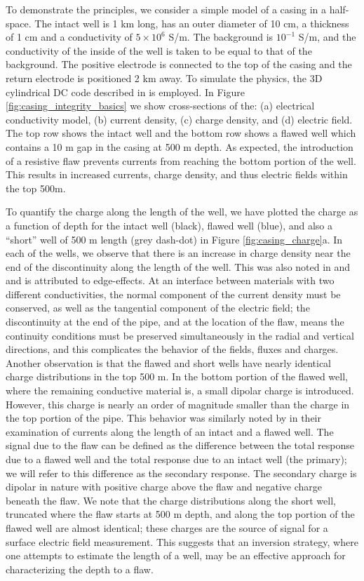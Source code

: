 \documentclass[extra,mreferee]{gji}
\begin{document}
To demonstrate the principles, we consider a simple model of a casing in a half-space. The intact well is 1 km long, has an outer diameter of 10 cm, a thickness of 1 cm and a conductivity of $5\times10^6$ S/m. The background is $10^{-1}$ S/m, and the conductivity of the inside of the well is taken to be equal to that of the background. The positive electrode is connected to the top of the casing and the return electrode is positioned 2 km away. To simulate the physics, the 3D cylindrical DC code described in \cite{Heagy2018a} is employed. In Figure \ref{fig:casing_integrity_basics} we show cross-sections of the: (a) electrical conductivity model, (b) current density, (c) charge density, and (d) electric field. The top row shows the intact well and the bottom row shows a flawed well which contains a 10 m gap in the casing at 500 m depth. As expected, the introduction of a resistive flaw prevents currents from reaching the bottom portion of the well. This results in increased currents, charge density, and thus electric fields within the top 500m.


To quantify the charge along the length of the well, we have plotted the charge as a function of depth for the intact well (black), flawed well (blue), and also a ``short'' well of 500 m length (grey dash-dot) in Figure \ref{fig:casing_charge}a. In each of the wells, we observe that there is an increase in charge density near the end of the discontinuity along the length of the well. This was also noted  in \cite{Griffiths1997} and \cite{Heagy2018a} and is attributed to edge-effects. At an interface between materials with two different conductivities, the normal component of the current density must be conserved, as well as the tangential component of the electric field; the discontinuity at the end of the pipe, and at the location of the flaw, means the continuity conditions must be preserved simultaneously in the radial and vertical directions, and this complicates the behavior of the fields, fluxes and charges. Another observation is that the flawed and short wells have nearly identical charge distributions in the top 500 m. In the bottom portion of the flawed well, where the remaining conductive material is, a small dipolar charge is introduced. However, this charge is nearly an order of magnitude smaller than the charge in the top portion of the pipe. This behavior was similarly noted by \cite{Wilt2018, Wilt2018a} in their examination of currents along the length of an intact and a flawed well.
The signal due to the flaw can be defined as the difference between the total response due to a flawed well and the total response due to an intact well (the primary); we will refer to this difference as the secondary response. The secondary charge is dipolar in nature with positive charge above the flaw and negative charge beneath the flaw. We note that the charge distributions along the short well, truncated where the flaw starts at 500 m depth, and along the top portion of the flawed well are almost identical; these charges are the source of signal for a surface electric field measurement. This suggests that an inversion strategy, where one attempts to estimate the length of a well, may be an effective approach for characterizing the depth to a flaw.
\end{document}
